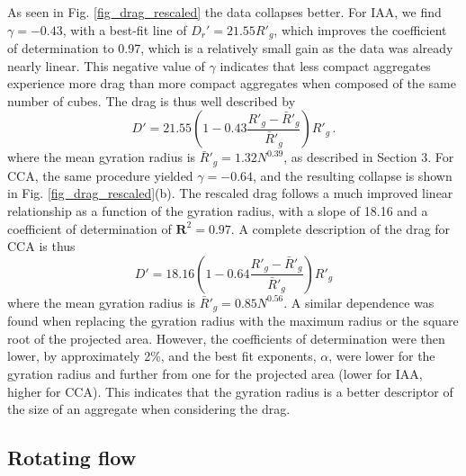 As seen in Fig. \ref{fig_drag_rescaled} the data collapses better. For IAA, we find $\gamma = -0.43$, with a best-fit line of  $D_r' = 21.55 R'_g$, which improves the coefficient of determination to 0.97, which is a relatively small gain as the data was already nearly linear. This negative value of $\gamma$ indicates that less compact aggregates experience more drag than more compact aggregates when composed of the same number of cubes.
The drag is thus well described by
\begin{equation}
D' = 21.55 \left(1 - 0.43  \frac{R'_g - \bar{R}'_g}{\bar{R}'_g}\right )  R'_g \, . 
\label{eq_drag_rescaledIAA}
\end{equation}
where the mean gyration radius is $\bar{R}'_g = 1.32N^{0.39}$, as described in Section 3.
For CCA,  the same procedure yielded $\gamma = -0.64$, and the resulting collapse is shown in Fig. \ref{fig_drag_rescaled}(b).
The rescaled drag follows a much improved linear relationship as a function of the gyration radius, with a slope of 18.16 and a coefficient of determination of $\mathbf{R}^2=0.97$. A complete description of the drag for CCA is thus
\begin{equation}
D' = 18.16 \left(1 -0.64  \frac{R'_g - \bar{R}'_g}{\bar{R}'_g}\right) R'_g
\label{eq_drag_rescaledCCA}
\end{equation}
where the mean gyration radius is $\bar{R}'_g = 0.85N^{0.56}$.  
A similar dependence was found when replacing the gyration radius with the maximum radius or the square root of the projected area. However, the coefficients of determination were then lower, by approximately 2\%, and the best fit exponents, $\alpha$, were lower for the gyration radius and further from one for the projected area (lower for IAA, higher for CCA). This indicates that the gyration radius is a better descriptor of the size of an aggregate when considering the drag.

\subsection{Rotating flow}

